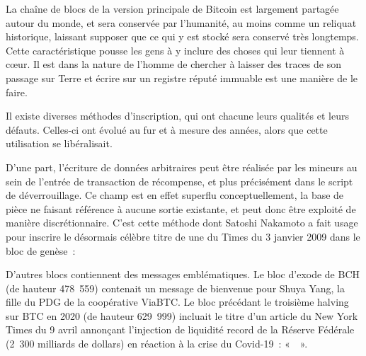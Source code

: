 La chaîne de blocs de la version principale de Bitcoin est largement partagée autour du monde, et sera conservée par l'humanité, au moins comme un reliquat historique, laissant supposer que ce qui y est stocké sera conservé très longtemps. Cette caractéristique pousse les gens à y inclure des choses qui leur tiennent à cœur. Il est dans la nature de l'homme de chercher à laisser des traces de son passage sur Terre et écrire sur un registre réputé immuable est une manière de le faire.

Il existe diverses méthodes d'inscription, qui ont chacune leurs qualités et leurs défauts. Celles-ci ont évolué au fur et à mesure des années, alors que cette utilisation se libéralisait.

D'une part, l'écriture de données arbitraires peut être réalisée par les mineurs au sein de l'entrée de transaction de récompense, et plus précisément dans le script de déverrouillage. Ce champ est en effet superflu conceptuellement, la base de pièce ne faisant référence à aucune sortie existante, et peut donc être exploité de manière discrétionnaire. C'est cette méthode dont Satoshi Nakamoto a fait usage pour inscrire le désormais célèbre titre de une du Times du 3 janvier 2009 dans le bloc de genèse~:

\begin{quote}
\end{quote}

D'autres blocs contiennent des messages emblématiques. Le bloc d'exode de BCH (de hauteur 478~559) contenait un message de bienvenue pour Shuya Yang, la fille du PDG de la coopérative ViaBTC. Le bloc précédant le troisième halving sur BTC en 2020 (de hauteur 629~999) incluait le titre d'un article du New York Times du 9 avril annonçant l'injection de liquidité record de la Réserve Fédérale (2~300 milliards de dollars) en réaction à la crise du Covid-19~: «~~».

